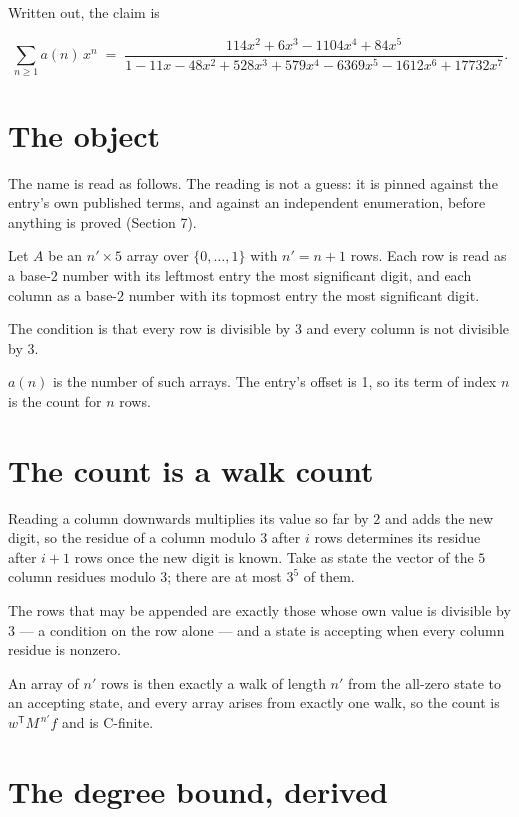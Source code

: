 \documentclass[11pt]{article}
\theoremstyle{definition}
\begin{document}
Written out, the claim is

\[\sum_{n \ge 1} a(n)\,x^n \;=\; \frac{114x^{2} + 6x^{3} - 1104x^{4} + 84x^{5}}{1 - 11x - 48x^{2} + 528x^{3} + 579x^{4} - 6369x^{5} - 1612x^{6} + 17732x^{7}}.\]

\section{The object}

The name is read as follows. The reading is not a guess: it is pinned against the entry's own published terms, and against an independent enumeration, before anything is proved (Section 7).

Let $A$ be an $n' \times 5$ array over $\{0,\dots,1\}$ with $n' = n + 1$ rows. Each row is read as a base-$2$ number with its leftmost entry the most significant digit, and each column as a base-$2$ number with its topmost entry the most significant digit.

The condition is that every row is divisible by $3$ and every column is not divisible by $3$.

$a(n)$ is the number of such arrays. The entry's offset is 1, so its term of index $n$ is the count for $n$ rows.

\section{The count is a walk count}

Reading a column downwards multiplies its value so far by $2$ and adds the new digit, so the residue of a column modulo $3$ after $i$ rows determines its residue after $i+1$ rows once the new digit is known. Take as state the vector of the $5$ column residues modulo $3$; there are at most $3^{5}$ of them.

The rows that may be appended are exactly those whose own value is divisible by $3$ --- a condition on the row alone --- and a state is accepting when every column residue is nonzero.

An array of $n'$ rows is then exactly a walk of length $n'$ from the all-zero state to an accepting state, and every array arises from exactly one walk, so the count is $w^{\mathsf T}M^{\,n'}f$ and is C-finite.

\section{The degree bound, derived}
\end{document}
